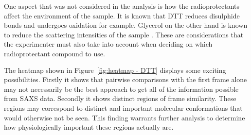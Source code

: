 One aspect that was not considered in the analysis is how the radioprotectants affect the environment of the sample.
It is known that DTT reduces disulphide bonds and undergoes oxidation for example.
Glycerol on the other hand is known to reduce the scattering intensities of the sample \cite{jeffries2015limiting}.
These are considerations that the experimenter must also take into account when deciding on which radioprotectant compound to use.

The heatmap shown in Figure~\ref{fig:heatmap - DTT} displays some exciting possibilities.
Firstly it shows that pairwise comparisons with the first frame alone may not necessarily be the best approach to get all of the information possible from SAXS data.
Secondly it shows distinct regions of frame similarity.
These regions may correspond to distinct and important molecular conformations that would otherwise not be seen.
This finding warrants further analysis to determine how physiologically important these regions actually are.
